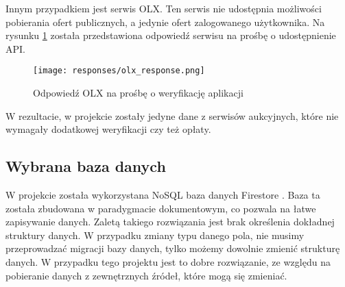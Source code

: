 Innym przypadkiem jest serwis OLX. Ten serwis nie udostępnia możliwości pobierania ofert publicznych, a jedynie ofert zalogowanego użytkownika. Na rysunku \ref*{olx_response} została przedstawiona odpowiedź serwisu na prośbę o udostępnienie API.

\begin{figure}[H]
    \centering
    \texttt{[image: responses/olx\_response.png]}
    \caption{Odpowiedź OLX na prośbę o weryfikację aplikacji}
    \label{olx_response}
\end{figure}

W rezultacie, w projekcie zostały jedyne dane z serwisów aukcyjnych, które nie wymagały dodatkowej weryfikacji czy też opłaty.

\subsection{Wybrana baza danych}
W projekcie została wykorzystana NoSQL \cite{NoSQL} baza danych Firestore \cite{firestore}. Baza ta została zbudowana w paradygmacie dokumentowym, co pozwala na łatwe zapisywanie danych. Zaletą takiego rozwiązania jest brak określenia dokładnej struktury danych. W przypadku zmiany typu danego pola, nie musimy przeprowadzać migracji bazy danych, tylko możemy dowolnie zmienić strukturę danych. W przypadku tego projektu jest to dobre rozwiązanie, ze względu na pobieranie danych z zewnętrznych źródeł, które mogą się zmieniać.

